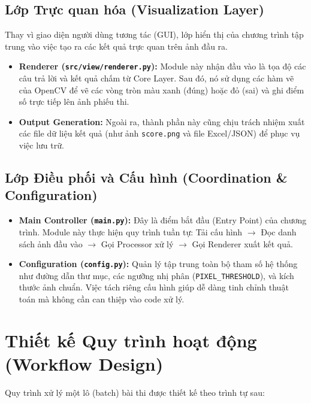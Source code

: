 \documentclass[6pt, a4paper]{report}
\begin{document}
	\subsection{Lớp Trực quan hóa (Visualization Layer)}
	Thay vì giao diện người dùng tương tác (GUI), lớp hiển thị của chương trình tập trung vào việc tạo ra các kết quả trực quan trên ảnh đầu ra.
	\begin{itemize}
		\item \textbf{Renderer (\texttt{src/view/renderer.py}):} Module này nhận đầu vào là tọa độ các câu trả lời và kết quả chấm từ Core Layer. Sau đó, nó sử dụng các hàm vẽ của OpenCV để vẽ các vòng tròn màu xanh (đúng) hoặc đỏ (sai) và ghi điểm số trực tiếp lên ảnh phiếu thi.
		\item \textbf{Output Generation:} Ngoài ra, thành phần này cũng chịu trách nhiệm xuất các file dữ liệu kết quả (như ảnh \texttt{score.png} và file Excel/JSON) để phục vụ việc lưu trữ.
	\end{itemize}
	
	\subsection{Lớp Điều phối và Cấu hình (Coordination \& Configuration)}
	\begin{itemize}
		\item \textbf{Main Controller (\texttt{main.py}):} Đây là điểm bắt đầu (Entry Point) của chương trình. Module này thực hiện quy trình tuần tự: Tải cấu hình $\rightarrow$ Đọc danh sách ảnh đầu vào $\rightarrow$ Gọi Processor xử lý $\rightarrow$ Gọi Renderer xuất kết quả.
		\item \textbf{Configuration (\texttt{config.py}):} Quản lý tập trung toàn bộ tham số hệ thống như đường dẫn thư mục, các ngưỡng nhị phân (\texttt{PIXEL\_THRESHOLD}), và kích thước ảnh chuẩn. Việc tách riêng cấu hình giúp dễ dàng tinh chỉnh thuật toán mà không cần can thiệp vào code xử lý.
	\end{itemize}
	
	\section{Thiết kế Quy trình hoạt động (Workflow Design)}
	
	Quy trình xử lý một lô (batch) bài thi được thiết kế theo trình tự sau:
	
\end{document}
